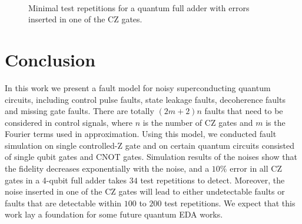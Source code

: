 \documentclass[conference, 9pt]{IEEEtran}
\begin{document}
\begin{figure}
    \\
    \caption{Minimal test repetitions for a quantum full adder with errors inserted in one of the CZ gates.}
    \label{fig:pattern2}
\end{figure}

\section{Conclusion}
In this work we present a fault model for noisy superconducting quantum circuits, including control pulse faults, state leakage faults, decoherence faults and missing gate faults. There are totally $(2m+2)n$ faults that need to be considered in control signals, where $n$ is the number of CZ gates and $m$ is the Fourier terms used in approximation. Using this model, we conducted  fault simulation  on single controlled-Z gate and on certain quantum circuits consisted of single qubit gates and CNOT gates. Simulation results of the noises show that the fidelity decreases exponentially with the noise, and a $10\%$ error in all CZ gates in a 4-qubit full adder takes $34$ test repetitions to detect. Moreover, the noise inserted in one of the CZ gates will lead to either undetectable faults or faults that are detectable within $100$ to $200$ test repetitions. We expect that this work lay a foundation for some future quantum EDA works.

%
%

\printbibliography
\end{document}
